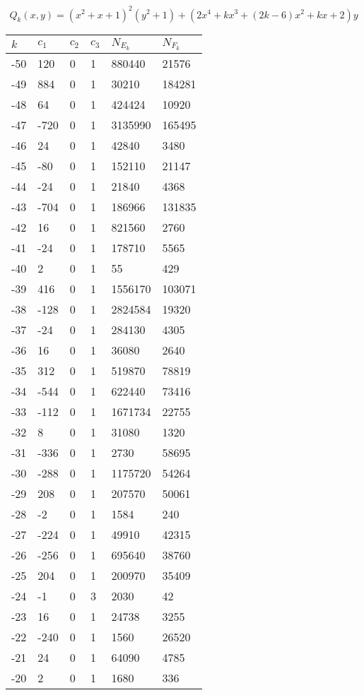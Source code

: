 \documentclass{amsart}
\begin{document}
\clearpage
$$Q_k(x,y)=(x^2+x+1)^2(y^2+1) + (2x^4 + kx^3 + (2k - 6)x^2 + kx + 2)y$$
\begin{longtable}{llllll}
\hline
$k$ & $c_1$ & $c_2$ & $c_3$ & $N_{E_k}$ & $N_{F_k}$\\
\hline
-50 & 120 & 0 & 1 & 880440 & 21576\\
-49 & 884 & 0 & 1 & 30210 & 184281\\
-48 & 64 & 0 & 1 & 424424 & 10920\\
-47 & -720 & 0 & 1 & 3135990 & 165495\\
-46 & 24 & 0 & 1 & 42840 & 3480\\
-45 & -80 & 0 & 1 & 152110 & 21147\\
-44 & -24 & 0 & 1 & 21840 & 4368\\
-43 & -704 & 0 & 1 & 186966 & 131835\\
-42 & 16 & 0 & 1 & 821560 & 2760\\
-41 & -24 & 0 & 1 & 178710 & 5565\\
-40 & 2 & 0 & 1 & 55 & 429\\
-39 & 416 & 0 & 1 & 1556170 & 103071\\
-38 & -128 & 0 & 1 & 2824584 & 19320\\
-37 & -24 & 0 & 1 & 284130 & 4305\\
-36 & 16 & 0 & 1 & 36080 & 2640\\
-35 & 312 & 0 & 1 & 519870 & 78819\\
-34 & -544 & 0 & 1 & 622440 & 73416\\
-33 & -112 & 0 & 1 & 1671734 & 22755\\
-32 & 8 & 0 & 1 & 31080 & 1320\\
-31 & -336 & 0 & 1 & 2730 & 58695\\
-30 & -288 & 0 & 1 & 1175720 & 54264\\
-29 & 208 & 0 & 1 & 207570 & 50061\\
-28 & -2 & 0 & 1 & 1584 & 240\\
-27 & -224 & 0 & 1 & 49910 & 42315\\
-26 & -256 & 0 & 1 & 695640 & 38760\\
-25 & 204 & 0 & 1 & 200970 & 35409\\
-24 & -1 & 0 & 3 & 2030 & 42\\
-23 & 16 & 0 & 1 & 24738 & 3255\\
-22 & -240 & 0 & 1 & 1560 & 26520\\
-21 & 24 & 0 & 1 & 64090 & 4785\\
-20 & 2 & 0 & 1 & 1680 & 336\\

\end{longtable}
\end{document}
